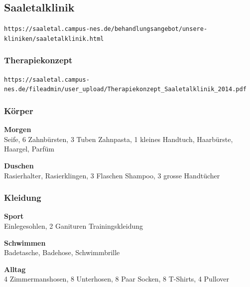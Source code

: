 \documentclass[10pt,a4paper]{article}
\begin{document}
% 





\subsection{Saaletalklinik}

\verb+https://saaletal.campus-nes.de/behandlungsangebot/unsere-kliniken/saaletalklinik.html+


\subsubsection{Therapiekonzept}

\verb+https://saaletal.campus-nes.de/fileadmin/user_upload/Therapiekonzept_Saaletalklinik_2014.pdf+


\subsubsection{Körper}

{\bf Morgen} \\
Seife, 6 Zahnbürsten, 3 Tuben Zahnpasta, 1 kleines Handtuch, Haarbürste, Haargel, Parfüm

\vskip 4pt
{\bf Duschen} \\
Rasierhalter, Rasierklingen, 3 Flaschen Shampoo, 3 grosse Handtücher


\subsubsection{Kleidung}

\vskip 4pt
{\bf Sport} \\
Einlegesohlen, 2 Ganituren Trainingskleidung


\vskip 4pt
{\bf Schwimmen} \\
Badetasche, Badehose, Schwimmbrille

\vskip 4pt
{\bf Alltag} \\
4 Zimmermanshosen, 8 Unterhosen, 8 Paar Socken, 8 T-Shirts, 4 Pullover
\end{document}
